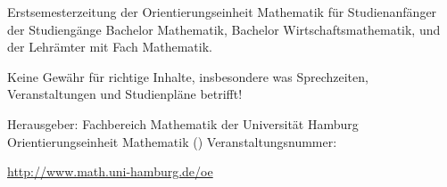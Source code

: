 Erstsemesterzeitung der Orientierungseinheit Mathematik für Studienanfänger der
Studiengänge Bachelor Mathematik, Bachelor Wirtschaftsmathematik, und der
Lehrämter mit Fach Mathematik.

\medskip Keine Gewähr für richtige Inhalte, insbesondere was Sprechzeiten,
Veranstaltungen und Studienpläne betrifft!

\medskip Herausgeber: \newline
Fachbereich Mathematik der Universität Hamburg \newline
Orientierungseinheit Mathematik (\dateShort) \newline
Veranstaltungsnummer: \stineNo

\url{http://www.math.uni-hamburg.de/oe}
